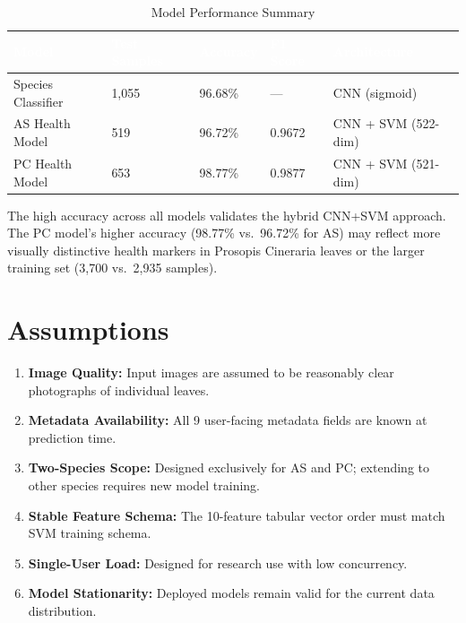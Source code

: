 \documentclass[11pt,a4paper,oneside]{report}
\begin{document}
\begin{table}[H]
\centering\footnotesize
\caption{Model Performance Summary}
\label{tab:model-performance}
\begin{tabularx}{\textwidth}{l l l l l}
\toprule
\rowcolor{tableheader}
\textcolor{white}{Model} & \textcolor{white}{Test Samples} & \textcolor{white}{Accuracy} & \textcolor{white}{F1 Score} & \textcolor{white}{Architecture} \\
\midrule
Species Classifier & 1,055 & 96.68\% & --- & CNN (sigmoid) \\
AS Health Model    & 519   & 96.72\% & 0.9672 & CNN + SVM (522-dim) \\
PC Health Model    & 653   & 98.77\% & 0.9877 & CNN + SVM (521-dim) \\
\bottomrule
\end{tabularx}
\end{table}

The high accuracy across all models validates the hybrid CNN+SVM approach. The PC model's higher accuracy (98.77\% vs.\ 96.72\% for AS) may reflect more visually distinctive health markers in Prosopis Cineraria leaves or the larger training set (3,700 vs.\ 2,935 samples).

\section{Assumptions}

\begin{enumerate}
  \item \textbf{Image Quality:} Input images are assumed to be reasonably clear photographs of individual leaves.
  \item \textbf{Metadata Availability:} All 9 user-facing metadata fields are known at prediction time.
  \item \textbf{Two-Species Scope:} Designed exclusively for AS and PC; extending to other species requires new model training.
  \item \textbf{Stable Feature Schema:} The 10-feature tabular vector order must match SVM training schema.
  \item \textbf{Single-User Load:} Designed for research use with low concurrency.
  \item \textbf{Model Stationarity:} Deployed models remain valid for the current data distribution.
\end{enumerate}


\end{document}
